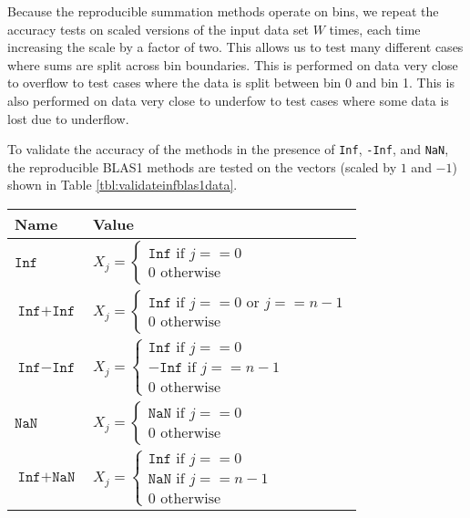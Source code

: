   Because the reproducible summation methods operate on bins, we repeat the accuracy tests on scaled versions of the input data set $W$ times, each time increasing the scale by a factor of two. This allows us to test many different cases where sums are split across bin boundaries. This is performed on data very close to overflow to test cases where the data is split between bin 0 and bin 1. This is also performed on data very close to underfow to test cases where some data is lost due to underflow.

  To validate the accuracy of the methods in the presence of \texttt{Inf}, \texttt{-Inf}, and \texttt{NaN}, the reproducible BLAS1 methods are tested on the vectors (scaled by $1$ and $-1$) shown in Table \ref{tbl:validateinfblas1data}.
    \begin{table}[!htbp]
        \centering
        \begin{tabular}{ | l |  l |} \hline
            Name & Value\\ \hline
            $\texttt{Inf}$ & $X_j = \begin{cases} \texttt{Inf} \text{ if } j == 0 \\ 0 \text{ otherwise} \end{cases}$ \\ \hline
            $\texttt{Inf} + \texttt{Inf}$ & $X_j = \begin{cases} \texttt{Inf} \text{ if } j == 0 \text{ or } j == n - 1 \\ 0 \text{ otherwise} \end{cases}$\\ \hline
            $\texttt{Inf} - \texttt{Inf}$ & $X_j = \begin{cases} \texttt{Inf} \text{ if } j == 0 \\ -\texttt{Inf} \text{ if } j == n - 1 \\ 0 \text{ otherwise} \end{cases}$\\ \hline
            $\texttt{NaN}$ & $X_j = \begin{cases} \texttt{NaN} \text{ if } j == 0 \\ 0 \text{ otherwise} \end{cases}$\\ \hline
            $\texttt{Inf} + \texttt{NaN}$ & $X_j = \begin{cases} \texttt{Inf} \text{ if } j == 0 \\ \texttt{NaN} \text{ if } j == n - 1 \\ 0 \text{ otherwise} \end{cases}$\\ \hline

\end{tabular}
\end{table}
